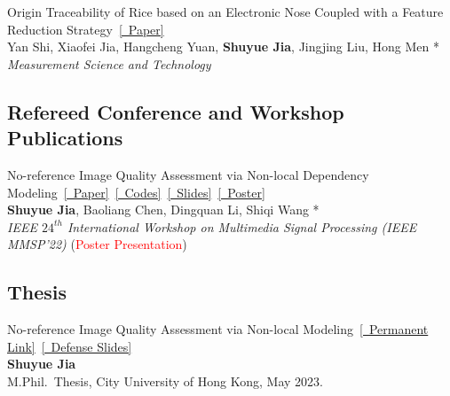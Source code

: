 \documentclass{my_cv}
\begin{document}
\hspace*{\fill}

\workitemsone
{Origin Traceability of Rice based on an Electronic Nose Coupled with a Feature Reduction Strategy~\href{https://iopscience.iop.org/article/10.1088/1361-6501/abb9e7/meta}{[\aiOpenAccess~Paper]} \\
Yan Shi, Xiaofei Jia, Hangcheng Yuan, \textbf{Shuyue Jia}, Jingjing Liu, Hong Men *\\
\emph{Measurement Science and Technology}
}

\hspace*{\fill}


\subsection{\textbf{Refereed Conference and Workshop Publications}}
\workitemsone
{No-reference Image Quality Assessment via Non-local Dependency Modeling~\href{https://ieeexplore.ieee.org/abstract/document/9950035}{[\aiIEEE~Paper]}~\href{https://github.com/SuperBruceJia/NLNet-IQA}{[\faGithub~Codes]}~\href{https://shuyuej.com/files/MMSP/MMSP22_Slides.pdf}{[\faFile~Slides]}~\href{https://shuyuej.com/files/MMSP/MMSP22_Poster.pdf}{[\faFile~Poster]}\\
\textbf{Shuyue Jia}, Baoliang Chen, Dingquan Li, Shiqi Wang *\\
\emph{IEEE $24^{th}$ International Workshop on Multimedia Signal Processing (IEEE MMSP'22)} (\textcolor{red}{Poster Presentation})
}

\hspace*{\fill}


\subsection{\textbf{Thesis}}
\workitemsone
{No-reference Image Quality Assessment via Non-local Modeling~\href{https://scholars.cityu.edu.hk/en/theses/noreference-image-quality-assessment-via-nonlocal-modeling(2d1e72fb-2405-43df-aac9-4838b6da1875).html}{[\faFile~Permanent Link]}~\href{https://shuyuej.com/files/Thesis/MPhil-Thesis-Defense-Presentation-ShuyueJia.pdf}{[\faFile~Defense Slides]}\\
\textbf{Shuyue Jia}\\
M.Phil.~Thesis, City University of Hong Kong, May 2023.
}
\end{document}
